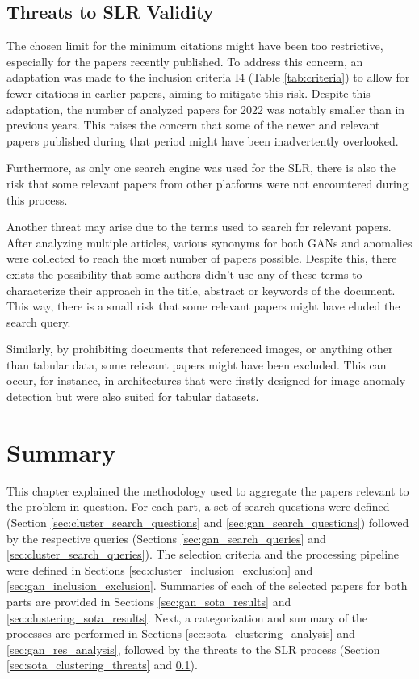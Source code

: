\subsection{Threats to SLR Validity}\label{sec:gan_slr_threats}
The chosen limit for the minimum citations might have been too restrictive, especially for the papers recently published. To address this concern, an adaptation was made to the inclusion criteria I4 (Table \ref{tab:criteria}) to allow for fewer citations in earlier papers, aiming to mitigate this risk. Despite this adaptation, the number of analyzed papers for 2022 was notably smaller than in previous years. This raises the concern that some of the newer and relevant papers published during that period might have been inadvertently overlooked. 

Furthermore, as only one search engine was used for the SLR, there is also the risk that some relevant papers from other platforms were not encountered during this process. 

Another threat may arise due to the terms used to search for relevant papers. After analyzing multiple articles, various synonyms for both GANs and anomalies were collected to reach the most number of papers possible. Despite this, there exists the possibility that some authors didn't use any of these terms to characterize their approach in the title, abstract or keywords of the document. This way, there is a small risk that some relevant papers might have eluded the search query.

Similarly, by prohibiting documents that referenced images, or anything other than tabular data, some relevant papers might have been excluded. This can occur, for instance, in architectures that were firstly designed for image anomaly detection but were also suited for tabular datasets.

\section{Summary}\label{sec:summary}
This chapter explained the methodology used to aggregate the papers relevant to the problem in question. For each part, a set of search questions were defined (Section \ref{sec:cluster_search_questions} and \ref{sec:gan_search_questions}) followed by the respective queries (Sections \ref{sec:gan_search_queries} and \ref{sec:cluster_search_queries}). The selection criteria and the processing pipeline were defined in Sections \ref{sec:cluster_inclusion_exclusion} and \ref{sec:gan_inclusion_exclusion}. Summaries of each of the selected papers for both parts are provided in Sections \ref{sec:gan_sota_results} and \ref{sec:clustering_sota_results}. Next, a categorization and summary of the processes are performed in Sections \ref{sec:sota_clustering_analysis} and \ref{sec:gan_res_analysis}, followed by the threats to the SLR process (Section \ref{sec:sota_clustering_threats} and \ref{sec:gan_slr_threats}).

